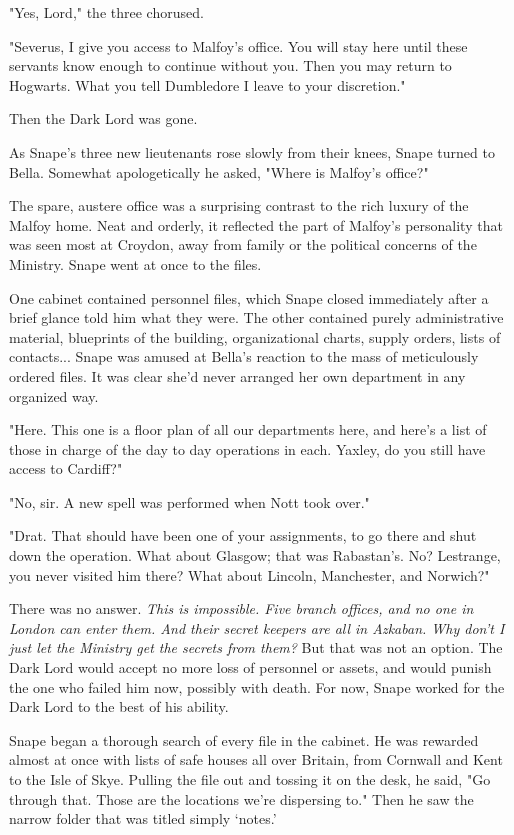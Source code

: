 "Yes, Lord," the three chorused.

"Severus, I give you access to Malfoy's office. You will stay here until these servants know enough to continue without you. Then you may return to Hogwarts. What you tell Dumbledore I leave to your discretion."

Then the Dark Lord was gone.

As Snape's three new lieutenants rose slowly from their knees, Snape turned to Bella. Somewhat apologetically he asked, "Where is Malfoy's office?"

The spare, austere office was a surprising contrast to the rich luxury of the Malfoy home. Neat and orderly, it reflected the part of Malfoy's personality that was seen most at Croydon, away from family or the political concerns of the Ministry. Snape went at once to the files.

One cabinet contained personnel files, which Snape closed immediately after a brief glance told him what they were. The other contained purely administrative material, blueprints of the building, organizational charts, supply orders, lists of contacts... Snape was amused at Bella's reaction to the mass of meticulously ordered files. It was clear she'd never arranged her own department in any organized way.

"Here. This one is a floor plan of all our departments here, and here's a list of those in charge of the day to day operations in each. Yaxley, do you still have access to Cardiff?"

"No, sir. A new spell was performed when Nott took over."

"Drat. That should have been one of your assignments, to go there and shut down the operation. What about Glasgow; that was Rabastan's. No? Lestrange, you never visited him there? What about Lincoln, Manchester, and Norwich?"

There was no answer. \emph{This is impossible. Five branch offices, and no one in London can enter them. And their secret keepers are all in Azkaban. Why don't I just let the Ministry get the secrets from them?} But that was not an option. The Dark Lord would accept no more loss of personnel or assets, and would punish the one who failed him now, possibly with death. For now, Snape worked for the Dark Lord to the best of his ability.

Snape began a thorough search of every file in the cabinet. He was rewarded almost at once with lists of safe houses all over Britain, from Cornwall and Kent to the Isle of Skye. Pulling the file out and tossing it on the desk, he said, "Go through that. Those are the locations we're dispersing to." Then he saw the narrow folder that was titled simply `notes.'

